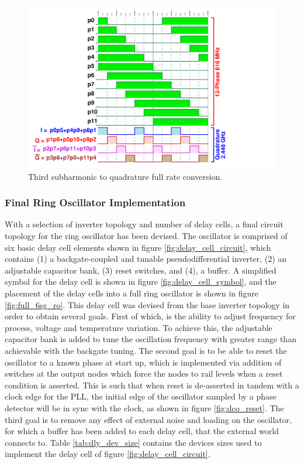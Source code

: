 			\begin{figure}[htb!]
			        \centering
			        \includegraphics[width=1.0\textwidth, angle=0]{./figs/design/ro_12ph_quad}
			    \caption{Third subharmonic to quadrature full rate conversion.}
			    \label{fig:ro_phases}
			\end{figure}


	\subsubsection{Final Ring Oscillator Implementation}
	With a selection of inverter topology and number of delay cells, a final circuit topology for the ring oscillator has been devised. The oscillator is comprised of six basic delay cell elements shown in figure \ref{fig:delay_cell_circuit}, which contains (1) a backgate-coupled and tunable pseudodifferential inverter, (2) an adjustable capacitor bank, (3) reset switches, and (4), a buffer. A simplified symbol for the delay cell is shown in figure \ref{fig:delay_cell_symbol}, and the placement of the delay cells into a full ring oscillator is shown in figure \ref{fig:full_6sg_ro}. This delay cell was devised from the base inverter topology in order to obtain several goals. First of which, is the ability to adjust frequency for process, voltage and temperature variation. To achieve this, the adjustable capacitor bank is added to tune the oscillation frequency with greater range than achievable with the backgate tuning. The second goal is to be able to reset the oscillator to a known phase at start up, which is implemented via addition of switches at the output nodes which force the nodes to rail levels when a reset condition is asserted. This is such that when reset is de-asserted in tandem with a clock edge for the PLL, the initial edge of the oscillator sampled by a phase detector will be in sync with the clock, as shown in figure \ref{fig:dco_reset}. The third goal is to remove any effect of external noise and loading on the oscillator, for which a buffer has been added to each delay cell, that the external world connects to. Table \ref{tab:dly_dev_size} contains the devices sizes used to implement the delay cell of figure \ref{fig:delay_cell_circuit}.

